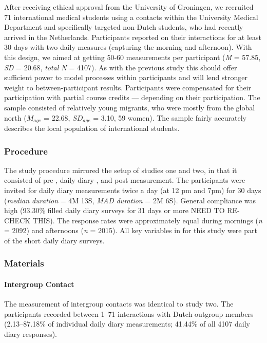 \documentclass[man, 12pt, a4paper]{apa7}
\theoremstyle{break}
\theoremstyle{plain}
\begin{document}
After receiving ethical approval from the University of Groningen, we
recruited 71 international medical students using a contacts within the
University Medical Department and specifically targeted non-Dutch
students, who had recently arrived in the Netherlands. Participants
reported on their interactions for at least 30 days with two daily
measures (capturing the morning and afternoon). With this design, we
aimed at getting 50-60 measurements per participant (\textit{M} = 57.85,
\textit{SD} = 20.68, \textit{total N} = 4107). As with the previous
study this should offer sufficient power to model processes within
participants and will lend stronger weight to between-participant
results. Participants were compensated for their participation with
partial course credits --- depending on their participation. The sample
consisted of relatively young migrants, who were mostly from the global
north (\(M_{age}\) = 22.68, \(SD_{age}\) = 3.10, 59 women). The sample
fairly accurately describes the local population of international
students.

\subsubsection{Procedure}

The study procedure mirrored the setup of studies one and two, in that
it consisted of pre-, daily diary-, and post-measurement. The
participants were invited for daily diary measurements twice a day (at
12 pm and 7pm) for 30 days (\textit{median duration} = 4M 13S,
\textit{MAD duration} = 2M 6S). General compliance was high (93.30\%
filled daily diary surveys for 31 days or more NEED TO RE-CHECK THIS).
The response rates were approximately equal during mornings (\textit{n}
= 2092) and afternoons (\textit{n} = 2015). All key variables in for
this study were part of the short daily diary surveys.

\subsubsection{Materials}

\paragraph{Intergroup Contact}

The measurement of intergroup contacts was identical to study two. The
participants recorded between 1--71 interactions with Dutch outgroup
members (2.13--87.18\% of individual daily diary measurements; 41.44\%
of all 4107 daily diary responses).
\end{document}
